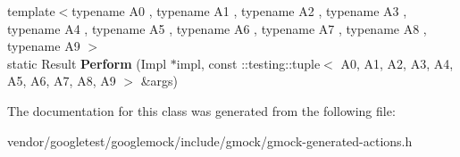 \begin{DoxyCompactItemize}
\item 
{\footnotesize template$<$typename A0 , typename A1 , typename A2 , typename A3 , typename A4 , typename A5 , typename A6 , typename A7 , typename A8 , typename A9 $>$ }\\static Result {\bfseries Perform} (Impl $\ast$impl, const \+::testing\+::tuple$<$ A0, A1, A2, A3, A4, A5, A6, A7, A8, A9 $>$ \&args)\hypertarget{classtesting_1_1internal_1_1ActionHelper_adfe6c86332cc09b352ec5ccbad1d3988}{}\label{classtesting_1_1internal_1_1ActionHelper_adfe6c86332cc09b352ec5ccbad1d3988}

\end{DoxyCompactItemize}


The documentation for this class was generated from the following file\+:\begin{DoxyCompactItemize}
\item 
vendor/googletest/googlemock/include/gmock/gmock-\/generated-\/actions.\+h\end{DoxyCompactItemize}
